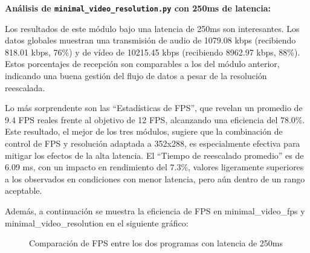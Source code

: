 \vspace{\baselineskip}

\textbf{Análisis de \texttt{minimal\_video\_resolution.py} con 250ms de latencia:}
\vspace{\baselineskip}

Los resultados de este módulo bajo una latencia de 250ms son interesantes. Los datos globales muestran una transmisión de audio de 1079.08 kbps (recibiendo 818.01 kbps, 76\%) y de vídeo de 10215.45 kbps (recibiendo 8962.97 kbps, 88\%). Estos porcentajes de recepción son comparables a los del módulo anterior, indicando una buena gestión del flujo de datos a pesar de la resolución reescalada.
\vspace{\baselineskip}

Lo más sorprendente son las ``Estadísticas de FPS'', que revelan un promedio de 9.4 FPS reales frente al objetivo de 12 FPS, alcanzando una eficiencia del 78.0\%. Este resultado, el mejor de los tres módulos, sugiere que la combinación de control de FPS y resolución adaptada a 352x288, es especialmente efectiva para mitigar los efectos de la alta latencia. El ``Tiempo de reescalado promedio'' es de 6.09 ms, con un impacto en rendimiento del 7.3\%, valores ligeramente superiores a los observados en condiciones con menor latencia, pero aún dentro de un rango aceptable.

\vspace{\baselineskip}

Además, a continuación se muestra la eficiencia de FPS en minimal\_video\_fps y minimal\_video\_resolution en el siguiente gráfico:
\begin{figure}[H]
\centering
{}
\caption{Comparación de FPS entre los dos programas con latencia de 250ms}
\label{fig:comparacionfps_250ms}
\end{figure}

